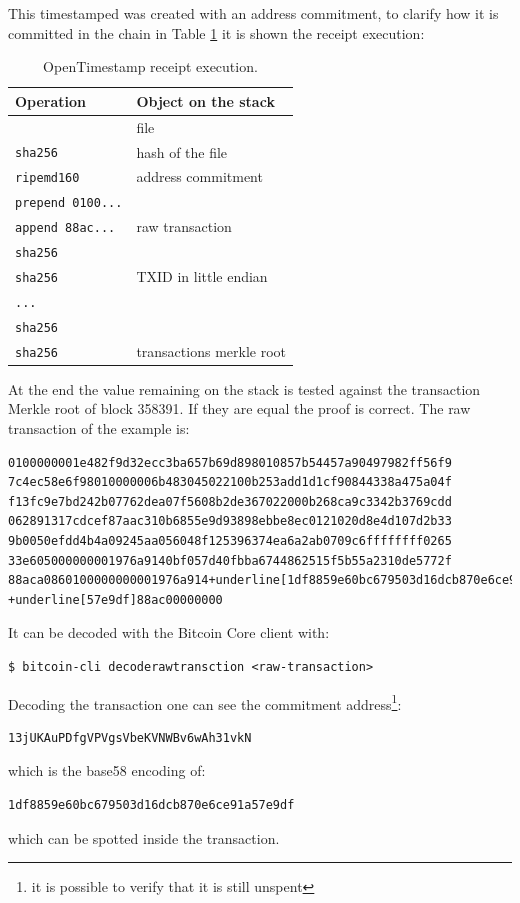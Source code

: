This timestamped was created with an address commitment, to clarify how it is committed in the chain in Table \ref{tab:ots-ex} it is shown the receipt execution:

\begin{table}
\begin{center}
\begin{tabular}{|p{3cm}|p{4cm}|}
	\hline
	\textbf{Operation} & \textbf{Object on the stack} \\ \hline
 & file \\ 
	\verb|sha256| & hash of the file \\ 
	\verb|ripemd160| & address commitment \\ 
	\verb|prepend 0100...| &  \\ 
	\verb|append 88ac...| & raw transaction \\ 
	\verb|sha256| &  \\ 
	\verb|sha256| & TXID in little endian \\ 
	\verb|...| &  \\ 
	\verb|sha256| &  \\ 
	\verb|sha256| & transactions merkle root \\ \hline
\end{tabular}
\end{center}
\caption[OpenTimestamp receipt execution.]{OpenTimestamp receipt execution.}
\label{tab:ots-ex}
\end{table}
At the end the value remaining on the stack is tested against the transaction Merkle root of block 358391. 
If they are equal the proof is correct.
The raw transaction of the example is:
\begin{Verbatim}[commandchars=+\[\], frame=single]
0100000001e482f9d32ecc3ba657b69d898010857b54457a90497982ff56f9
7c4ec58e6f98010000006b483045022100b253add1d1cf90844338a475a04f
f13fc9e7bd242b07762dea07f5608b2de367022000b268ca9c3342b3769cdd
062891317cdcef87aac310b6855e9d93898ebbe8ec0121020d8e4d107d2b33
9b0050efdd4b4a09245aa056048f125396374ea6a2ab0709c6ffffffff0265
33e605000000001976a9140bf057d40fbba6744862515f5b55a2310de5772f
88aca0860100000000001976a914+underline[1df8859e60bc679503d16dcb870e6ce91a]
+underline[57e9df]88ac00000000
\end{Verbatim}
It can be decoded with the Bitcoin Core client with:
\begin{verbatim}
$ bitcoin-cli decoderawtransction <raw-transaction>
\end{verbatim}
Decoding the transaction one can see the commitment address\footnote{it is possible to verify that it is still unspent}:
\begin{verbatim}
13jUKAuPDfgVPVgsVbeKVNWBv6wAh31vkN
\end{verbatim}
which is the base58 encoding of:
\begin{verbatim}
1df8859e60bc679503d16dcb870e6ce91a57e9df
\end{verbatim}
which can be spotted inside the transaction.

